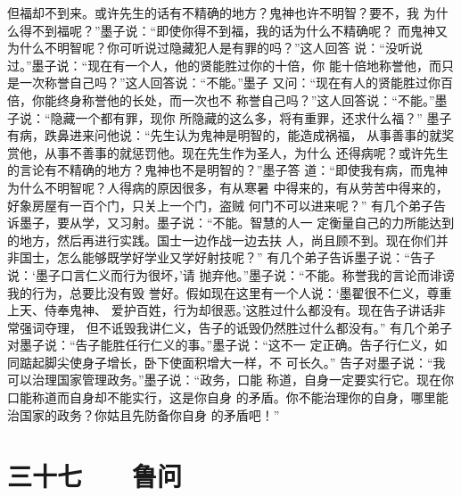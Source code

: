 \documentclass[12pt,UTF8]{ctexbook}
\begin{document}
但福却不到来。或许先生的话有不精确的地方？鬼神也许不明智？要不，我 
为什么得不到福呢？”墨子说：“即使你得不到福，我的话为什么不精确呢？ 
而鬼神又为什么不明智呢？你可听说过隐藏犯人是有罪的吗？”这人回答 
说：“没听说过。”墨子说：“现在有一个人，他的贤能胜过你的十倍，你 
能十倍地称誉他，而只是一次称誉自己吗？”这人回答说：“不能。”墨子 
又问：“现在有人的贤能胜过你百倍，你能终身称誉他的长处，而一次也不 
称誉自己吗？”这人回答说：“不能。”墨子说：“隐藏一个都有罪，现你 
所隐藏的这么多，将有重罪，还求什么福？” 
墨子有病，跌鼻进来问他说：“先生认为鬼神是明智的，能造成祸福， 
从事善事的就奖赏他，从事不善事的就惩罚他。现在先生作为圣人，为什么 
还得病呢？或许先生的言论有不精确的地方？鬼神也不是明智的？”墨子答 
道：“即使我有病，而鬼神为什么不明智呢？人得病的原因很多，有从寒暑 
中得来的，有从劳苦中得来的，好象房屋有一百个门，只关上一个门，盗贼 
何门不可以进来呢？” 
有几个弟子告诉墨子，要从学，又习射。墨子说：“不能。智慧的人一 
定衡量自己的力所能达到的地方，然后再进行实践。国士一边作战一边去扶 
人，尚且顾不到。现在你们并非国士，怎么能够既学好学业又学好射技呢？” 
有几个弟子告诉墨子说：“告子说：‘墨子口言仁义而行为很坏，’请 
抛弃他。”墨子说：“不能。称誉我的言论而诽谤我的行为，总要比没有毁 
誉好。假如现在这里有一个人说：‘墨翟很不仁义，尊重上天、侍奉鬼神、 
爱护百姓，行为却很恶。’这胜过什么都没有。现在告子讲话非常强词夺理， 
但不诋毁我讲仁义，告子的诋毁仍然胜过什么都没有。” 
有几个弟子对墨子说：“告子能胜任行仁义的事。”墨子说：“这不一 
定正确。告子行仁义，如同踮起脚尖使身子增长，卧下使面积增大一样，不 
可长久。” 
告子对墨子说：“我可以治理国家管理政务。”墨子说：“政务，口能 
称道，自身一定要实行它。现在你口能称道而自身却不能实行，这是你自身 
的矛盾。你不能治理你的自身，哪里能治国家的政务？你姑且先防备你自身 
的矛盾吧！” 


\chapter{三十七　　鲁问}
\end{document}
